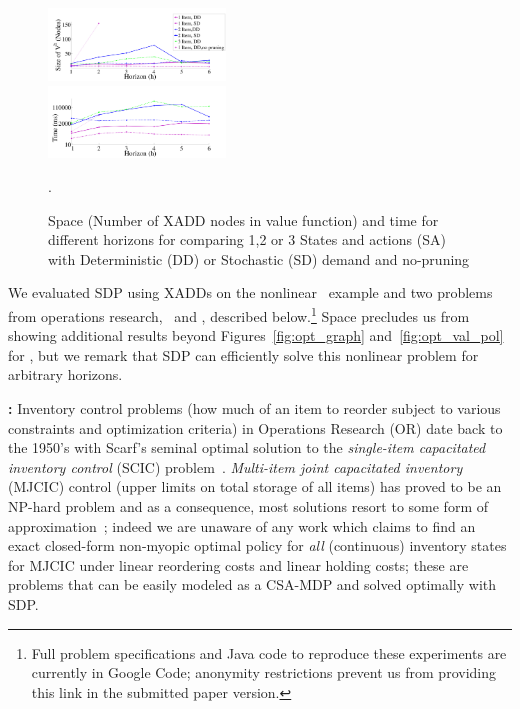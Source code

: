 \begin{figure}[tbp!]
\vspace{-5mm}
\centering
\includegraphics[width=0.42\textwidth]{new_pics/space1.pdf}\\
\vspace{-2mm}
\includegraphics[width=0.42\textwidth]{new_pics/time1.pdf}
\vspace{-2mm}
\caption{\footnotesize Space (Number of XADD nodes in value function) 
and time for different horizons for \InventoryControl comparing 
1,2 or 3 States and actions (SA) with Deterministic (DD) 
or Stochastic (SD) demand and no-pruning}.
\label{fig:invC}
\vspace{-3mm}
\end{figure}

\label{sec:results}
 
We evaluated SDP using XADDs on the nonlinear
\MarsRover\ example and two problems from operations research,
\InventoryControl\ and \WaterReservoir, described below.\footnote{
Full problem specifications and Java code to
reproduce these experiments are currently 
in Google Code; anonymity restrictions 
prevent us from providing this link in the submitted paper version.}
Space precludes us from showing 
additional results beyond Figures~\ref{fig:opt_graph}
and~\ref{fig:opt_val_pol} for
\MarsRover, but we remark that SDP can efficiently solve this
nonlinear problem for arbitrary horizons.

{\bf \InventoryControl:} Inventory control problems (how much of an
item to reorder subject to various constraints and optimization
criteria) in Operations Research (OR) date back to the 1950's with
Scarf's seminal optimal solution to the \emph{single-item capacitated
inventory control} (SCIC) problem~\cite{Scarf_Karlin58}.
\emph{Multi-item joint capacitated inventory} (MJCIC) control (upper limits
on total storage of all items) has proved to be an NP-hard problem and
as a consequence, most solutions resort to some form of
approximation~\cite{bitran,wusd10}; indeed we are unaware of any
work which claims to find an exact closed-form non-myopic
optimal policy for \emph{all} (continuous) inventory states for MJCIC
under linear reordering costs and linear holding costs; these are
problems that can be easily modeled as a CSA-MDP and solved optimally
with SDP.

